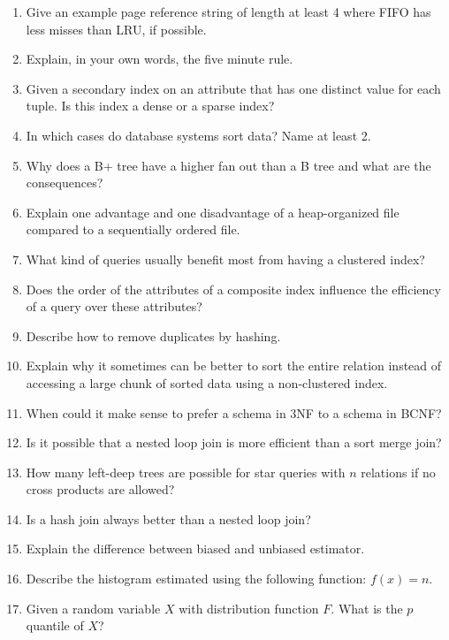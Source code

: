\begin{enumerate}[label=\arabic*.]

  \item Give an example page reference string of length at least 4 where FIFO has less misses than LRU, if possible.

  \item Explain, in your own words, the five minute rule.

  \item Given a secondary index on an attribute that has one distinct value for each tuple. Is this index a dense or a sparse index?

  \item In which cases do database systems sort data? Name at least 2.
  \item Why does a B+ tree have a higher fan out than a B tree and what are the consequences?

  \item Explain one advantage and one disadvantage of a heap-organized file compared to a sequentially ordered file.
  \item What kind of queries usually benefit most from having a clustered index?
  \item Does the order of the attributes of a composite index influence the efficiency of a query over these attributes?
  \item Describe how to remove duplicates by hashing.
  \item Explain why it sometimes can be better to sort the entire relation instead of accessing a large chunk of sorted data using a non-clustered index.
  \item When could it make sense to prefer a schema in 3NF to a schema in BCNF?

  \item Is it possible that a nested loop join is more efficient than a sort merge join?

  \item How many left-deep trees are possible for star queries with $n$ relations if no cross products are allowed?

  \item Is a hash join always better than a nested loop join?

  \item Explain the difference between biased and unbiased estimator.

  \item Describe the histogram estimated using the following function: $f(x) = n$.
  \item Given a random variable $X$ with distribution function $F$. What is the $p$ quantile of $X$?


\end{enumerate}
